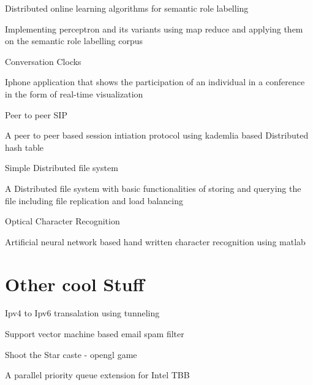 \documentclass[letterpaper,10pt]{article}
\begin{document}
\begin{reslist}
	
	
	\item {Distributed online learning algorithms for semantic role labelling \date{Inprogress}}
	\begin{reslist}
		\item {Implementing perceptron and its variants using map reduce and applying them on the semantic role labelling corpus }
     \end{reslist}
     
     \item{Conversation Clocks  \date {Inprogress}}
     \begin{reslist}
        \item {Iphone application that shows the participation of an individual in a conference in the form of real-time visualization}
     \end{reslist}
	\item {Peer to peer SIP}
	\begin{reslist}
	  \item {A peer to peer based session intiation protocol using kademlia based Distributed hash table}
    \end{reslist}
	
	\item { Simple Distributed file system}
   \begin{reslist}
		\item {A Distributed file system with basic functionalities of storing and querying the file including file replication and load balancing }
   \end{reslist}
    
    \item {Optical Character Recognition }
	\begin{reslist}
		\item {Artificial neural network based hand written character recognition using matlab}
    \end{reslist}
\end{reslist}
\section{Other cool Stuff}
 \begin{reslist}
 \item {Ipv4 to Ipv6 transalation using tunneling}
 \item {Support vector machine based email spam filter}
 \item {Shoot the Star caste - opengl game}
 \item {A parallel priority queue extension for Intel TBB}
 \end{reslist}
\end{document}
